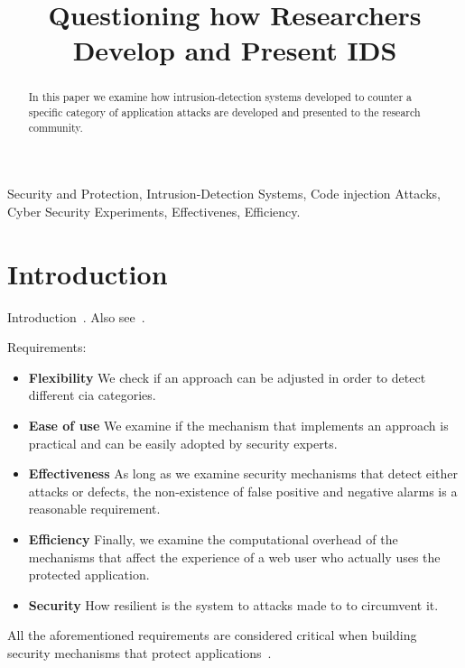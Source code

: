 \documentclass[conference]{IEEEtran}
\date{}
\begin{document}
\author{
}

\title{Questioning how Researchers Develop and Present IDS}

\maketitle
\begin{abstract}
In this paper we examine how intrusion-detection
systems developed to counter a specific category
of application attacks are developed and presented to
the research community.
\end{abstract}

\begin{IEEEkeywords}
Security and Protection, Intrusion-Detection Systems, Code injection Attacks, Cyber Security Experiments, Effectivenes, Efficiency.
\end{IEEEkeywords}

\IEEEpeerreviewmaketitle

\section{Introduction}

Introduction~\cite{I05}. Also see~\cite{A00}.

Requirements:
\begin{itemize}
	\item {\bf Flexibility} We check if an approach
can be adjusted in order to detect different {\sc cia} categories.
	\item {\bf Ease of use} We examine if the mechanism that
implements an approach is practical and can be easily adopted
by security experts.
	\item {\bf Effectiveness} As long as we examine security
mechanisms that detect either attacks or defects,
the non-existence of false positive and negative alarms
is a reasonable requirement.
	\item {\bf Efficiency} Finally, we examine
the computational overhead of the mechanisms that affect the experience of
a web user who actually uses the protected application.
	\item {\bf Security} How resilient is the system to
attacks made to to circumvent it.
\end{itemize}
All the aforementioned requirements are considered critical
when building security mechanisms that protect
applications~\cite{A01,A00}.
\end{document}
